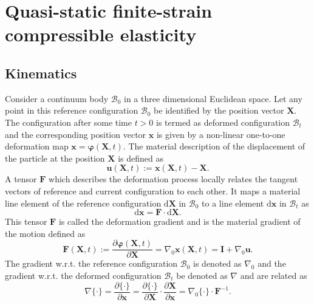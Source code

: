 \chapter{Quasi-static finite-strain compressible elasticity}

\section{Kinematics}
Consider a continuum body $\mathcal{B}_0$ in a three dimensional Euclidean space. Let any point in this reference configuration $\mathcal{B}_0$ be identified by the position vector $\mathbf{X}$. The configuration after some time $t > 0$ is termed as deformed configuration $\mathcal{B}_t$ and the corresponding position vector $\mathbf{x}$ is given by a non-linear one-to-one deformation map $\mathbf{x} = \bm{\varphi} (\mathbf{X}, t)$. The material description of the displacement of the particle at the position $\mathbf{X}$ is defined as
\begin{equation}
\mathbf{u}(\mathbf{X}, t) := \mathbf{x}(\mathbf{X}, t) - \mathbf{X}.
\end{equation}
A tensor $\mathbf{F}$ which describes the deformation process locally relates the tangent vectors of reference and current configuration to each other. It maps a material line element of the reference configuration $\bm{\mathrm{d}}\mathbf{X}$ in $\mathcal{B}_0$ to a line element $\bm{\mathrm{d}\mathbf{x}}$ in $\mathcal{B}_t$ as 
\begin{equation}
\bm{\mathrm{d}\mathbf{x}} = \mathbf{F} \cdot \bm{\mathrm{d}\mathbf{X}}.
\end{equation} 
This tensor $\mathbf{F}$ is called the deformation gradient and is the material gradient of the motion defined as
\begin{equation}
\mathbf{F}(\mathbf{X}, t) := \dfrac{\partial \bm{\varphi}(\mathbf{X}, t)}{\partial \mathbf{X}} = \nabla_0 \mathbf{x}(\mathbf{X}, t) = \mathbf{I} + \nabla_0 \mathbf{u}.
\label{eq:2.3}
\end{equation}
The gradient w.r.t. the reference configuration $\mathcal{B}_0$ is denoted as $\nabla_0$ and the gradient w.r.t. the deformed configuration $\mathcal{B}_t$ be denoted as $\nabla$ and are related as 
\begin{equation}
\nabla \{ \cdot \} = \dfrac{\partial \{ \cdot \} }{\partial \mathbf{x}} = \dfrac{\partial \{ \cdot \} }{\partial \mathbf{X}} \cdot \dfrac{\partial \mathbf{X}}{\partial \mathbf{x}} = \nabla_0 \{ \cdot \} \cdot \mathbf{F}^{-1}.
\end{equation} 
